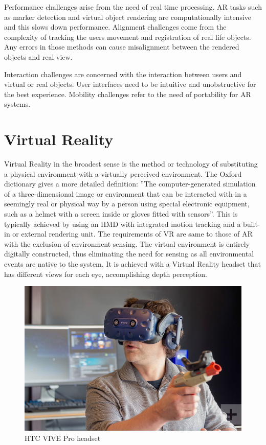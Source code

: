 \documentclass[12pt, a4paper,oneside, nocenter]{thesis}
\begin{document}
Performance challenges arise from the need of real time processing. AR tasks such as marker detection
and virtual object rendering are computationally intensive and this slows down performance.
Alignment challenges come from the complexity of tracking the users movement and registration of real
life objects. Any errors in those methods can cause misalignment between the rendered objects and
real view.\par
Interaction challenges are concerned with the interaction between users and virtual or real objects.
User interfaces need to be intuitive and unobstructive for the best experience. Mobility challenges refer
to the need of portability for AR systems.
\\
\section{Virtual Reality}
Virtual Reality in the broadest sense is the method or technology of substituting a physical environment with a virtually perceived environment. The Oxford dictionary gives a more detailed definition: 
''The computer-generated simulation of a three-dimensional image or environment that can be interacted with in a seemingly real or physical way by a person using special electronic equipment, such as a helmet with a screen inside or gloves fitted with sensors''.
This is typically achieved by using an HMD with integrated motion tracking and a built-in or external rendering unit.
The requirements of VR are same to those of AR with the exclusion of environment sensing. The virtual environment
is entirely digitally constructed, thus eliminating the need for sensing as all environmental events are native to the system. It is achieved with a Virtual Reality headset that has different views for each eye, accomplishing depth perception.
\begin{figure}[H]
	\includegraphics[width=\textwidth]{htc-vive-pro-headset}
	\caption{HTC VIVE Pro headset\citep{htc-vive-pro-review}}
	\label{fig:htc-vive-pro-headset}
\end{figure}
\end{document}
